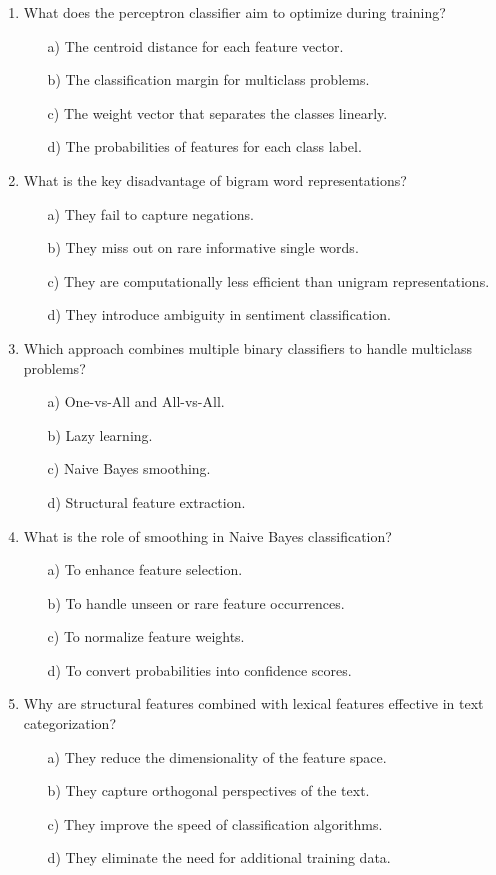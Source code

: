\documentclass[8pt]{extarticle}
\begin{document}
\begin{multicols}{2}
\begin{enumerate}
\item What does the perceptron classifier aim to optimize during training?
\begin{itemize}
\item[a)] The centroid distance for each feature vector.
\item[b)] The classification margin for multiclass problems.
\item[c)] The weight vector that separates the classes linearly.
\item[d)] The probabilities of features for each class label.
\end{itemize}


\item What is the key disadvantage of bigram word representations?
\begin{itemize}
\item[a)] They fail to capture negations.
\item[b)] They miss out on rare informative single words.
\item[c)] They are computationally less efficient than unigram representations.
\item[d)] They introduce ambiguity in sentiment classification.
\end{itemize}


\item Which approach combines multiple binary classifiers to handle multiclass problems?
\begin{itemize}
\item[a)] One-vs-All and All-vs-All.
\item[b)] Lazy learning.
\item[c)] Naive Bayes smoothing.
\item[d)] Structural feature extraction.
\end{itemize}


\item What is the role of smoothing in Naive Bayes classification?
\begin{itemize}
\item[a)] To enhance feature selection.
\item[b)] To handle unseen or rare feature occurrences.
\item[c)] To normalize feature weights.
\item[d)] To convert probabilities into confidence scores.
\end{itemize}


\item Why are structural features combined with lexical features effective in text categorization?
\begin{itemize}
\item[a)] They reduce the dimensionality of the feature space.
\item[b)] They capture orthogonal perspectives of the text.
\item[c)] They improve the speed of classification algorithms.
\item[d)] They eliminate the need for additional training data.
\end{itemize}



\end{enumerate}
\end{multicols}
\end{document}
